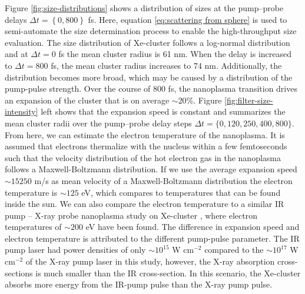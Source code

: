 Figure \ref{fig:size-distributions} shows a distribution of sizes at the pump--probe delays $\Delta t = \left\{0,800\right\}$ fs. Here, equation \eqref{eq:scattering from sphere} is used to semi-automate the size determination process to enable the high-throughput size evaluation. The size distribution of Xe-cluster follows a log-normal distribution \citep{Schutte-2002-IJMS} and at $\Delta t=0$ fs the mean cluster radius is 61 nm. When the delay is increased to $\Delta t=800$ fs, the mean cluster radius increases to 74 nm. Additionally, the distribution becomes more broad, which may be caused by a distribution of the pump-pulse strength. Over the course of 800 fs, the nanoplasma transition drives an expansion of the cluster that is on average $\sim 20 \%$. Figure \ref{fig:filter-size-intensity} left shows that the expansion speed is constant and summarizes the mean cluster radii over the pump--probe delay steps $\Delta t=\{0,120,250,400,800\}$. From here, we can estimate the electron temperature of the nanoplasma. It is assumed that electrons thermalize with the nucleus within a few femtoseconds such that the velocity distribution of the hot electron gas in the nanoplasma follows a Maxwell-Boltzmann distribution. If we use the average expansion speed $\sim 15250$ m/s as mean velocity of a Maxwell-Boltzmann distribution the electron temperature is $\sim 125$ eV, which compares to temperatures that can be found inside the sun. We can also compare the electron temperature to a similar IR pump -- X-ray probe nanoplasma study on Xe-cluster \citep{Gorkhover-2016-NatPho}, where electron temperatures of $\sim 200$ eV have been found. The difference in expansion speed and electron temperature is attributed to the different pump-pulse parameter. The IR pump laser had power densities of only $\sim 10^{15}$ W cm$^{-2}$ compared to the $\sim 10^{17}$ W cm$^{-2}$ of the X-ray pump laser in this study, however, the X-ray absorption cross-sections is much smaller than the IR cross-section. In this scenario, the Xe-cluster absorbs more energy from  the IR-pump pulse than the X-ray pump pulse.\\
